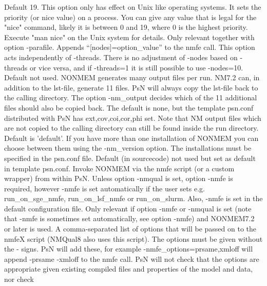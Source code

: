 \begin{optionlist}
\nextopt
{}
Default 19. This option only has effect on Unix like operating systems. It  sets the priority (or nice value) on a process. You can give any value that is legal for the "nice" command, likely it is between 0 and 19, where 0 is the highest priority. Execute "man nice" on the Unix system for details. 
\nextopt
{}
Only relevant together with option -parafile. Appends “[nodes]=option\_value” to the nmfe call. This option acts independently of -threads. There is no adjustment of -nodes based on -threads or vice versa, and if -threads=1 it is still possible to use -nodes=10. 
\nextopt
{}
Default not used.  NONMEM generates many output files per run. NM7.2 can, in addition to the lst-file, generate 11 files. PsN will always copy the lst-file back to the calling directory. The option -nm\_output decides which of the 11 additional files should also be copied back. The default is none, but the template psn.conf distributed with PsN has ext,cov,coi,cor,phi set. Note that NM output files which are not copied to the calling directory can still be found inside the run directory. 
\nextopt
{}
Default is 'default'. If you have more than one installation of NONMEM you can choose between them using the -nm\_version option. The installations must be specified in the psn.conf file. 
\nextopt
{}
Default (in sourcecode) not used but set as default in template psn.conf. 
Invoke NONMEM via the nmfe script (or a custom wrapper) from within PsN. 
Unless option -nmqual is set, option -nmfe is required, however -nmfe is 
set automatically if the user sets e.g. run\_on\_sge\_nmfe, 
run\_on\_lsf\_nmfe or run\_on\_slurm. Also, -nmfe is set in the default configuration file.
\nextopt
{}
Only relevant if option -nmfe or -nmqual is set (note that -nmfe is sometimes set automatically, see option -nmfe) and NONMEM7.2 or later is used. A comma-separated list of options that will be passed on to the nmfeX script (NMQual8 also uses this script). The options must be given without the - signs. PsN will add these, for example -nmfe\_options=prsame,xmloff will append \mbox{-prsame} \mbox{-xmloff} to the nmfe call. PsN will not check that the options are appropriate given existing compiled files and properties of the model and data, nor check 
\nextopt
{}

\end{optionlist}
